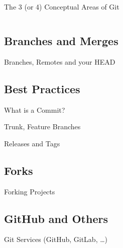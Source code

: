 \documentclass[xetex, handout]{beamer}
\begin{document}
\begin{frame}[fragile]{The 3 (or 4) Conceptual Areas of Git}
\begin{columns}
\begin{column}{.95\paperwidth}
    \end{column}
  \end{columns}
\end{frame}

\subsection{Branches and Merges}

\begin{frame}{Branches, Remotes and your HEAD}
\end{frame}

\subsection{Best Practices}

\begin{frame}{What is a Commit?}
\end{frame}

\begin{frame}{Trunk, Feature Branches}
\end{frame}

\begin{frame}{Releases and Tags}
\end{frame}

\subsection{Forks}

\begin{frame}{Forking Projects}
\end{frame}

\subsection{GitHub and Others}

\begin{frame}{Git Services (GitHub, GitLab, \ldots)}
\end{frame}
\end{document}
